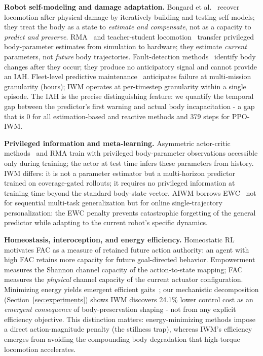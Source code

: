 \documentclass{article}
\begin{document}
{\textbf{Robot self-modeling and damage adaptation.}
Bongard et al.~\citep{bongard2006resilient} recover locomotion after physical damage by iteratively building and testing self-models; they treat the body as a state to \emph{estimate and compensate}, not as a capacity to \emph{predict and preserve}. RMA~\citep{kumar2021rma} and teacher-student locomotion~\citep{lee2020learning,miki2022learning} transfer privileged body-parameter estimates from simulation to hardware; they estimate \emph{current} parameters, not \emph{future} body trajectories. Fault-detection methods~\citep{fu2025contrastive,xu2023adapt} identify body changes after they occur; they produce no anticipatory signal and cannot provide an IAH. Fleet-level predictive maintenance~\citep{okeeffe2025anticipating} anticipates failure at multi-mission granularity (hours); IWM operates at per-timestep granularity within a single episode. The IAH is the precise distinguishing feature: we quantify the temporal gap between the predictor's first warning and actual body incapacitation - a gap that is 0 for all estimation-based and reactive methods and 379 steps for PPO-IWM.

\textbf{Privileged information and meta-learning.}
Asymmetric actor-critic methods~\citep{pinto2017asymmetric} and RMA train with privileged body-parameter observations accessible only during training; the actor at test time infers these parameters from history. IWM differs: it is not a parameter estimator but a multi-horizon predictor trained on coverage-gated rollouts; it requires no privileged information at training time beyond the standard body-state vector. AIWM borrows EWC~\citep{kirkpatrick2017overcoming} not for sequential multi-task generalization but for online single-trajectory personalization: the EWC penalty prevents catastrophic forgetting of the general predictor while adapting to the current robot's specific dynamics.

\textbf{Homeostasis, interoception, and energy efficiency.}
Homeostatic RL~\citep{keramati2011homeostatic} motivates FAC as a measure of retained future action authority: an agent with high FAC retains more capacity for future goal-directed behavior. Empowerment~\citep{klyubin2005empowerment} measures the Shannon channel capacity of the action-to-state mapping; FAC measures the \emph{physical} channel capacity of the current actuator configuration. Minimizing energy yields emergent efficient gaits~\citep{fu2021minimizing}; our mechanistic decomposition (Section~\ref{sec:experiments}) shows IWM discovers 24.1\% lower control cost as an \emph{emergent consequence} of body-preservation shaping - not from any explicit efficiency objective. This distinction matters: energy-minimizing methods impose a direct action-magnitude penalty (the stillness trap), whereas IWM's efficiency emerges from avoiding the compounding body degradation that high-torque locomotion accelerates.

}
\end{document}
